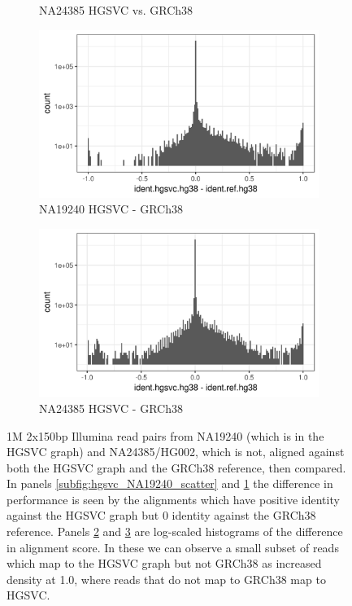 \begin{figure}[htbp!]
\begin{subfigure}[t]{0.49\textwidth}
    \caption{NA24385 HGSVC vs. GRCh38}
    \label{subfig:hgsvc_NA24385_scatter}
  \end{subfigure}
  \begin{subfigure}[t]{0.49\textwidth}
    \includegraphics[width=1.0\textwidth]{Chapter3/Figs/NA19240_hg38_vs_HGSVC_hist.png}
    \caption{NA19240 HGSVC - GRCh38}
    \label{subfig:hgsvc_NA19240_hist}
  \end{subfigure}
  \begin{subfigure}[t]{0.49\textwidth}
    \includegraphics[width=1.0\textwidth]{Chapter3/Figs/NA24385_hg38_vs_HGSVC_hist.png}
    \caption{NA24385 HGSVC - GRCh38}
    \label{subfig:hgsvc_NA24385_hist}
  \end{subfigure}
  \caption[Alignment against the HGSVC graph]{
    1M 2x150bp Illumina read pairs from NA19240 (which is in the HGSVC graph) and NA24385/HG002, which is not, aligned against both the HGSVC graph and the GRCh38 reference, then compared.
    In panels \ref{subfig:hgsvc_NA19240_scatter} and \ref{subfig:hgsvc_NA24385_scatter} the difference in performance is seen by the alignments which have positive identity against the HGSVC graph but 0 identity against the GRCh38 reference.
    Panels \ref{subfig:hgsvc_NA19240_hist} and \ref{subfig:hgsvc_NA24385_hist} are log-scaled histograms of the difference in alignment score.
    In these we can observe a small subset of reads which map to the HGSVC graph but not GRCh38 as increased density at 1.0, where reads that do not map to GRCh38 map to HGSVC.
   }
\label{fig:hgsvc_alignment}
\end{figure}


